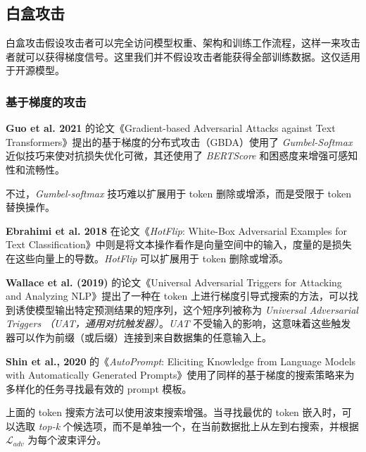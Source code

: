 \documentclass{article} %
\begin{document}
\subsection{白盒攻击}
白盒攻击假设攻击者可以完全访问模型权重、架构和训练工作流程，这样一来攻击者就可以获得梯度信号。这里我们并不假设攻击者能获得全部训练数据。这仅适用于开源模型。



\subsubsection{基于梯度的攻击}
\textbf{Guo et al. 2021} 的论文《Gradient-based Adversarial Attacks against Text Transformers》提出的基于梯度的分布式攻击（GBDA）使用了 \textit{Gumbel-Softmax} 近似技巧来使对抗损失优化可微，其还使用了 \textit{BERTScore} 和困惑度来增强可感知性和流畅性。

不过，\textit{Gumbel-softmax} 技巧难以扩展用于 token 删除或增添，而是受限于 token 替换操作。

\textbf{Ebrahimi et al. 2018} 在论文《\textit{HotFlip}: White-Box Adversarial Examples for Text Classification》中则是将文本操作看作是向量空间中的输入，度量的是损失在这些向量上的导数。\textit{HotFlip} 可以扩展用于 token 删除或增添。

\textbf{Wallace et al. (2019)} 的论文《Universal Adversarial Triggers for Attacking and Analyzing NLP》提出了一种在 token 上进行梯度引导式搜索的方法，可以找到诱使模型输出特定预测结果的短序列，这个短序列被称为 \textit{Universal Adversarial Triggers （UAT，通用对抗触发器）}。\textit{UAT} 不受输入的影响，这意味着这些触发器可以作为前缀（或后缀）连接到来自数据集的任意输入上。

\textbf{Shin et al., 2020} 的《\textit{AutoPrompt}: Eliciting Knowledge from Language Models with Automatically Generated Prompts》使用了同样的基于梯度的搜索策略来为多样化的任务寻找最有效的 prompt 模板。

上面的 token 搜索方法可以使用波束搜索增强。当寻找最优的 token 嵌入时，可以选取 \textit{top-k} 个候选项，而不是单独一个，在当前数据批上从左到右搜索，并根据 $\mathcal{L}_{adv}$ 为每个波束评分。
\end{document}

